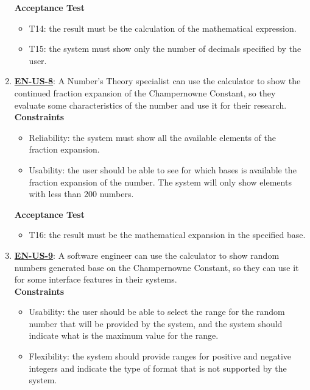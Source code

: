 \documentclass{report}
\begin{document}
\begin{enumerate}
\textbf{Acceptance Test}
\begin{itemize}
    \item T14: the result must be the calculation of the mathematical expression.
    \item T15: the system must show only the number of decimals specified by the user. \newline
\end{itemize}

\item \underline{\textbf{EN-US-8}}: A Number's Theory specialist can use the calculator to show the continued fraction expansion of the Champernowne Constant, so they evaluate some characteristics of the number and use it for their research. \\ \newline
\textbf{Constraints}
\begin{itemize}
    \item Reliability: the system must show all the available elements of the fraction expansion.  
    \item Usability: the user should be able to see for which bases is available the fraction expansion of the number. The system will only show elements with less than 200 numbers.
\end{itemize}

\textbf{Acceptance Test}
\begin{itemize}
    \item T16: the result must be the mathematical expansion in the specified base.\newline
\end{itemize}

\item \underline{\textbf{EN-US-9}}: A software engineer can use the calculator to show random numbers generated base on the Champernowne Constant, so they can use it for some interface features in their systems. \\ \newline
\textbf{Constraints}
\begin{itemize}
    \item Usability: the user should be able to select the range for the random number that will be provided by the system, and the system should indicate what is the maximum value for the range. 
    \item Flexibility: the system should provide ranges for positive and negative integers and indicate the type of format that is not supported by the system.
\end{itemize}


\end{enumerate}
\end{document}
